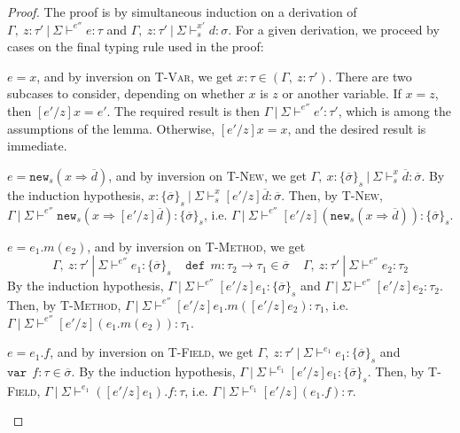 \documentclass{llncs}
\newcommand{\keywadj}[1]{\mathtt{#1}}
\newcommand{\keyw}[1]{\keywadj{#1}~}
\newcommand{\pcase}[1][]{
  \if\relax\detokenize{#1}\relax
    \def\thiscase{}
  \else
    \def\thiscase{~#1}
  \fi
  \item
}
\begin{document}
\begin{proof} The proof is by simultaneous induction on a derivation of $\Gamma,~z : \tau'~|~\Sigma \vdash^{e''}e : \tau$ and $\Gamma,~z : \tau'~|~\Sigma \vdash^{x'}_s d : \sigma$. For a given derivation, we proceed by cases on the final typing rule used in the proof:

\begin{pcases}
\pcase[\textsc{T-Var}]
$e = x$, and by inversion on \textsc{T-Var}, we get $x : \tau \in (\Gamma,~z : \tau')$. There are two subcases to consider, depending on whether $x$ is $z$ or another variable. If $x = z$, then $[e'/z]x = e'$. The required result is then $\Gamma~|~\Sigma \vdash^{e''} e' : \tau'$, which is among the assumptions of the lemma. Otherwise, $[e'/z]x = x$, and the desired result is immediate.
\\
\pcase[\textsc{T-New}]
$e = \keywadj{new}_{s}(x \Rightarrow \overline{d})$, and by inversion on \textsc{T-New}, we get $\Gamma,~x : \{ \overline{\sigma} \}_{s}~|~\Sigma \vdash^x_s \overline{d} : \overline{\sigma}$. By the induction hypothesis, $x : \{ \overline{\sigma} \}_{s}~|~\Sigma \vdash^x_s [e'/z]\overline{d} : \overline{\sigma}$. Then, by \textsc{T-New}, $\Gamma~|~\Sigma \vdash^{e''} \keywadj{new}_{s}(x \Rightarrow [e'/z]\overline{d}) : \{ \overline{\sigma} \}_{s}$, i.e. $\Gamma~|~\Sigma \vdash^{e''} [e'/z](\keywadj{new}_{s}(x \Rightarrow \overline{d})) : \{ \overline{\sigma} \}_{s}$.
\\
\pcase[\textsc{T-Method}]
$e = e_1.m(e_2)$, and by inversion on \textsc{T-Method}, we get
\[
\Gamma,~z : \tau'~|~\Sigma \vdash^{e''} e_1 : \{ \overline{\sigma} \}_s~~~~~\keyw{def}~ m : \tau_2 \rightarrow \tau_1 \in \overline{\sigma}~~~~~\Gamma,~z : \tau'~|~\Sigma \vdash^{e''} e_2 : \tau_2
\]
By the induction hypothesis, $\Gamma~|~\Sigma \vdash^{e''} [e'/z]e_1 : \{ \overline{\sigma} \}_s$ and $\Gamma~|~\Sigma \vdash^{e''} [e'/z]e_2 : \tau_2$. Then, by \textsc{T-Method}, $\Gamma~|~\Sigma \vdash^{e''} [e'/z]e_1.m([e'/z]e_2) : \tau_1$, i.e. $\Gamma~|~\Sigma \vdash^{e''} [e'/z](e_1.m(e_2)) : \tau_1$.
\\
\pcase[\textsc{T-Field}]
$e = e_1.f$, and by inversion on \textsc{T-Field}, we get $\Gamma,~z : \tau'~|~\Sigma \vdash^{e_1} e_1 : \{ \overline{\sigma} \}_s$ and $\keyw{var}~ f : \tau \in \overline{\sigma}$. By the induction hypothesis, $\Gamma~|~\Sigma \vdash^{e_1} [e'/z]e_1 : \{ \overline{\sigma} \}_s$. Then, by \textsc{T-Field}, $\Gamma~|~\Sigma \vdash^{e_1} ([e'/z]e_1).f : \tau$, i.e. $\Gamma~|~\Sigma \vdash^{e_1} [e'/z](e_1.f) : \tau$.
\\

\end{pcases}
\end{proof}
\end{document}
